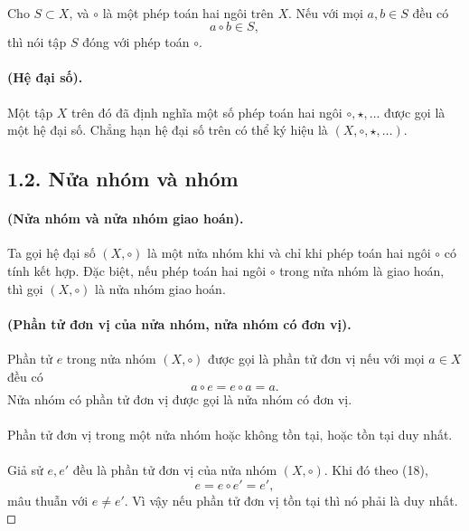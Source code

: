 \documentclass[11pt]{article}
\newcommand{\square}{\mathord{\vcenter{\hrule height .5pt
  \hbox{\vrule width .5pt height 5pt\kern5pt\vrule width .5pt}
  \hrule height .5pt}}}
\begin{document}
\paragraph{}
Cho \(S\subset X\), và \(\circ\) là một phép toán hai ngôi trên \(X\). Nếu
với mọi \(a,b\in S\) đều có
\[
  a\circ b\in S,
\]
thì nói tập \(S\) đóng với phép toán \(\circ\).

\paragraph{ (Hệ đại số).}
Một tập \(X\) trên đó đã định nghĩa một số phép toán hai ngôi
\(\circ,\star,\ldots\) được gọi là một hệ đại số. Chẳng hạn hệ đại số trên có
thể ký hiệu là \((X,\circ,\star,\ldots)\).

\subsection*{1.2. Nửa nhóm và nhóm}

\paragraph{ (Nửa nhóm và nửa nhóm giao hoán).}
Ta gọi hệ đại số \((X,\circ)\) là một nửa nhóm khi và chỉ khi phép toán hai
ngôi \(\circ\) có tính kết hợp. Đặc biệt, nếu phép toán hai ngôi \(\circ\)
trong nửa nhóm là giao hoán, thì gọi \((X,\circ)\) là nửa nhóm giao hoán.

\paragraph{ (Phần tử đơn vị của nửa nhóm, nửa nhóm có
đơn vị).}
Phần tử \(e\) trong nửa nhóm \((X,\circ)\) được gọi là phần tử đơn vị nếu
với mọi \(a\in X\) đều có
\[
  a\circ e=e\circ a=a.
\tag{18}
\]
Nửa nhóm có phần tử đơn vị được gọi là nửa nhóm có đơn vị.

\paragraph{}
Phần tử đơn vị trong một nửa nhóm hoặc không tồn tại, hoặc tồn tại duy nhất.

\paragraph{}
Giả sử \(e,e'\) đều là phần tử đơn vị của nửa nhóm \((X,\circ)\). Khi đó theo
(18),
\[
  e=e\circ e'=e',
\]
mâu thuẫn với \(e\ne e'\). Vì vậy nếu phần tử đơn vị tồn tại thì nó phải là
duy nhất. \(\square\)
\end{document}
